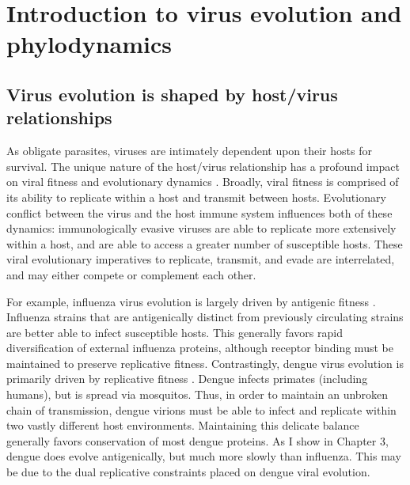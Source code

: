 %
%

%

\textpages
\chapter{Introduction to virus evolution and phylodynamics}
\section{Virus evolution is shaped by host/virus relationships}
As obligate parasites, viruses are intimately dependent upon their hosts for survival.
The unique nature of the host/virus relationship has a profound impact on viral fitness and evolutionary dynamics \citep{holmes2009evolution}.
Broadly, viral fitness is comprised of its ability to replicate within a host and transmit between hosts.
Evolutionary conflict between the virus and the host immune system influences both of these dynamics: immunologically evasive viruses are able to replicate more extensively within a host, and are able to access a greater number of susceptible hosts.
These viral evolutionary imperatives to replicate, transmit, and evade are interrelated, and may either compete or complement each other.

For example, influenza virus evolution is largely driven by antigenic fitness \citep{bush1999predicting}.
Influenza strains that are antigenically distinct from previously circulating strains are better able to infect susceptible hosts.
This generally favors rapid diversification of external influenza proteins, although receptor binding must be maintained to preserve replicative fitness.
Contrastingly, dengue virus evolution is primarily driven by replicative fitness \citep{grubaugh2016genetic}.
Dengue infects primates (including humans), but is spread via mosquitos.
Thus, in order to maintain an unbroken chain of transmission, dengue virions must be able to infect and replicate within two vastly different host environments.
Maintaining this delicate balance generally favors conservation of most dengue proteins.
As I show in Chapter 3, dengue does evolve antigenically, but much more slowly than influenza.
This may be due to the dual replicative constraints placed on dengue viral evolution.

